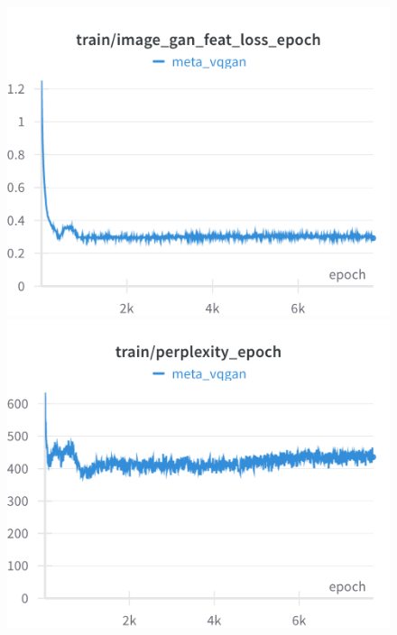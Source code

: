 
\begin{figure}[H]
\includegraphics[width=\linewidth]{detailed_engineering/Meta VQGAN/charts/Section-2-Panel-0-63j0lica5}
\caption{}
\endminipage\hfill
{}
\includegraphics[width=\linewidth]{detailed_engineering/Meta VQGAN/charts/Section-2-Panel-1-5nrgzgmoj}
\caption{}
\endminipage
\end{figure}

